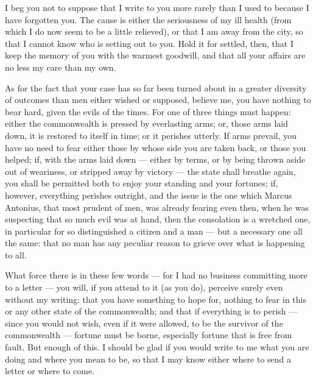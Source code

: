 

 I beg you not to suppose that I write to you more rarely than I used to because I have forgotten you. The cause is either the seriousness of my ill health (from which I do now seem to be a little relieved), or that I am away from the city, so that I cannot know who is setting out to you. Hold it for settled, then, that I keep the memory of you with the warmest goodwill, and that all your affairs are no less my care than my own.

 As for the fact that your case has so far been turned about in a greater diversity of outcomes than men either wished or supposed, believe me, you have nothing to bear hard, given the evils of the times. For one of three things must happen: either the commonwealth is pressed by everlasting arms; or, those arms laid down, it is restored to itself in time; or it perishes utterly. If arms prevail, you have no need to fear either those by whose side you are taken back, or those you helped; if, with the arms laid down --- either by terms, or by being thrown aside out of weariness, or stripped away by victory --- the state shall breathe again, you shall be permitted both to enjoy your standing and your fortunes; if, however, everything perishes outright, and the issue is the one which Marcus Antonius, that most prudent of men, was already fearing even then, when he was suspecting that so much evil was at hand, then the consolation is a wretched one, in particular for so distinguished a citizen and a man --- but a necessary one all the same: that no man has any peculiar reason to grieve over what is happening to all.

 What force there is in these few words --- for I had no business committing more to a letter --- you will, if you attend to it (as you do), perceive surely even without my writing: that you have something to hope for, nothing to fear in this or any other state of the commonwealth; and that if everything is to perish --- since you would not wish, even if it were allowed, to be the survivor of the commonwealth --- fortune must be borne, especially fortune that is free from fault. But enough of this. I should be glad if you would write to me what you are doing and where you mean to be, so that I may know either where to send a letter or where to come.
